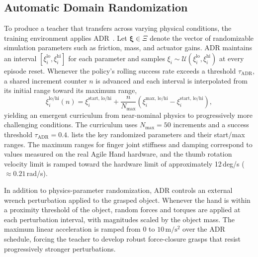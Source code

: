\subsection{Automatic Domain Randomization}%
\label{sec:adr_formulation}%

To produce a teacher that transfers across varying physical conditions, the training environment applies \ac{ADR}~\cite{OpenAI2020}.
Let $\boldsymbol{\xi} \in \Xi$ denote the vector of randomizable simulation parameters such as friction, mass, and actuator gains.
\ac{ADR} maintains an interval $[\xi_i^{\text{lo}}, \xi_i^{\text{hi}}]$ for each parameter and samples $\xi_i \sim \mathcal{U}(\xi_i^{\text{lo}}, \xi_i^{\text{hi}})$ at every episode reset.
Whenever the policy's rolling success rate exceeds a threshold $\tau_{\text{ADR}}$, a shared increment counter $n$ is advanced and each interval is interpolated from its initial range toward its maximum range,
%
\begin{equation}\label{eq:adr}
    \xi_i^{\text{lo/hi}}(n) = \xi_i^{\text{start, lo/hi}} + \frac{n}{N_{\text{max}}}\!\left(\xi_i^{\text{max, lo/hi}} - \xi_i^{\text{start, lo/hi}}\right),
\end{equation}
%
yielding an emergent curriculum from near-nominal physics to progressively more challenging conditions.
The curriculum uses $N_{\text{max}} = 50$ increments and a success threshold $\tau_{\text{ADR}} = 0.4$.
 lists the key randomized parameters and their start/max ranges.
The maximum ranges for finger joint stiffness and damping correspond to values measured on the real Agile Hand hardware, and the thumb rotation velocity limit is ramped toward the hardware limit of approximately 12\,deg/s ($\approx 0.21$\,rad/s).

In addition to physics-parameter randomization, \ac{ADR} controls an external wrench perturbation applied to the grasped object.
Whenever the hand is within a proximity threshold of the object, random forces and torques are applied at each perturbation interval, with magnitudes scaled by the object mass.
The maximum linear acceleration is ramped from $0$ to $10\,\mathrm{m/s^2}$ over the \ac{ADR} schedule, forcing the teacher to develop robust force-closure grasps that resist progressively stronger perturbations.

